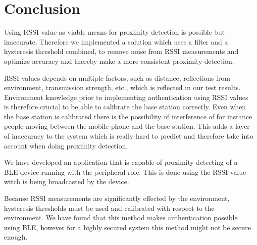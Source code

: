 \section{Conclusion}
Using RSSI value as viable means for proximity detection is possible but inaccurate. Therefore we implemented a solution which uses a filter and a hysteresis threshold combined, to remove noise from RSSI measurements and optimize accuracy and thereby make a more consistent proximity detection.

RSSI values depends on multiple factors, such as distance, reflections from environment, transmission strength, etc., which is reflected in our test results.
Environment knowledge prior to implementing authentication using RSSI values is therefore crucial to be able to calibrate the base station correctly. 
Even when the base station is calibrated there is the possibility of interference of for instance people moving between the mobile phone and the base station. 
This adds a layer of inaccuracy to the system which is really hard to predict and therefore take into account when doing proximity detection.

We have developed an application that is capable of proximity detecting of a BLE device running with the peripheral role. This is done using the RSSI value witch is being broadcasted by the device.

Because RSSI measurements are significantly effected by the environment, hysteresis thresholds must be used and calibrated with respect to the environment.
We have found that this method makes authentication possible using BLE, however for a highly secured system this method might not be secure enough.

%

